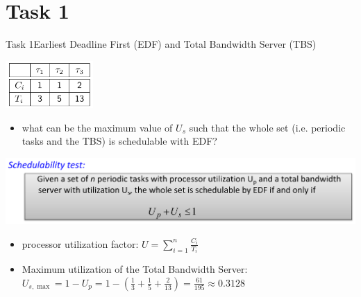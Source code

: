 
\section{Task 1}

\setcounter{task}{1}

\begin{frame}[allowframebreaks]{Task 1}{Earliest Deadline First (EDF) and Total Bandwidth Server (TBS)}
  \begin{tasknoinc}
    \centering
    \includegraphics[width=0.25\textwidth]{./figures/1_tasks.png}
    \begin{itemize}
      \item what can be the maximum value of $U_s$ such that the whole set (i.e. periodic tasks and the \alert{TBS}) is schedulable with \alert{EDF}?
    \end{itemize}
  \end{tasknoinc}
  \begin{requirementsnoinc}
    \includegraphics[width=\textwidth]{./figures/schedulability_test.png}
    \begin{itemize}
      \item \alert{processor utilization factor:} $\displaystyle U=\sum_{i=1}^n \frac{C_i}{T_i}$
    \end{itemize}
  \end{requirementsnoinc}
  \begin{solution}
    \begin{itemize}
      \item \alert{Maximum utilization of the Total Bandwidth Server:} $U_{s, \max }=1-U_p=1-(\frac{1}{3}+\frac{1}{5}+\frac{2}{13})=\frac{61}{195} \approx 0.3128$
    \end{itemize}
  \end{solution}
\end{frame}

